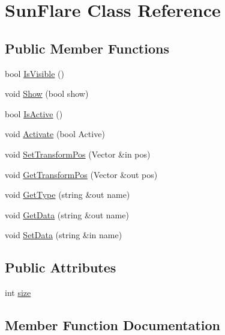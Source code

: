 \hypertarget{class_sun_flare}{}\section{Sun\+Flare Class Reference}
\label{class_sun_flare}
\subsection*{Public Member Functions}
\begin{DoxyCompactItemize}
\item 
bool \hyperlink{class_sun_flare_a6ee7ba00a655db20810004f2e3a0e6c5}{Is\+Visible} ()
\item 
void \hyperlink{class_sun_flare_a849cba0217528b018b5de15069a095c5}{Show} (bool show)
\item 
bool \hyperlink{class_sun_flare_a8ae934875f67a1447aeb5619ef813327}{Is\+Active} ()
\item 
void \hyperlink{class_sun_flare_a3e97d5df0968ffe1a04cacba42cdf85e}{Activate} (bool Active)
\item 
void \hyperlink{class_sun_flare_a393f28d63511068f8033a5261f27c61d}{Set\+Transform\+Pos} (Vector \&in pos)
\item 
void \hyperlink{class_sun_flare_a7f320b220f2aa5d9971d20cce280f772}{Get\+Transform\+Pos} (Vector \&out pos)
\item 
void \hyperlink{class_sun_flare_af4522c541902e2d92256b6ed67357715}{Get\+Type} (string \&out name)
\item 
void \hyperlink{class_sun_flare_ad10f9eb714e67064dc3cc428888b1cc2}{Get\+Data} (string \&out name)
\item 
void \hyperlink{class_sun_flare_a0f0ea3a4b145899c028577b7155b8cba}{Set\+Data} (string \&in name)
\end{DoxyCompactItemize}
\subsection*{Public Attributes}
\begin{DoxyCompactItemize}
\item 
int \hyperlink{class_sun_flare_a82fd97f7487781241075f8ea874a93ca}{size}
\end{DoxyCompactItemize}


\subsection{Member Function Documentation}
\hypertarget{class_sun_flare_a3e97d5df0968ffe1a04cacba42cdf85e}{}\label{class_sun_flare_a3e97d5df0968ffe1a04cacba42cdf85e} 
